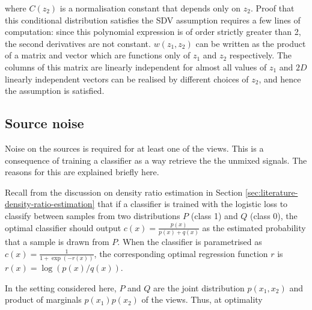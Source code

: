 where $C(z_2)$ is a normalisation constant that depends only on $z_2$.
Proof that this conditional distribution satisfies the SDV assumption requires a few lines of computation:
since this polynomial expression is of order strictly greater than 2, the second derivatives are not constant.
${w}(z_1, z_2)$ can be written as the product of a matrix and vector which are functions only of $z_1$ and $z_2$ respectively.
The columns of this matrix are linearly independent for almost all values of $z_1$ and $2D$ linearly independent vectors can be realised by different choices of $z_2$, and hence the assumption is satisfied.


\subsection{Source noise}\label{sec:converged}

Noise on the sources is required for at least one of the views. 
This is a consequence of training a classifier as a way retrieve the the unmixed signals.
The reasons for this are explained briefly here.

Recall from the discussion on density ratio estimation in Section \ref{sec:literature-density-ratio-estimation} that if a classifier is trained with the logistic loss to classify between samples from two distributions $P$ (class 1) and $Q$ (class 0), the optimal classifier should output $c(x) = \frac{p(x)}{p(x) + q(x)}$ as the estimated probability that a sample is drawn from $P$.
When the classifier is parametrised as $c(x) = \frac{1}{1 + \exp(-r(x))}$, the corresponding optimal regression function $r$ is $r(x) = \log( p(x) / q(x))$. 

In the setting considered here, $P$ and $Q$ are the joint distribution $p(x_1, x_2)$ and product of marginals $p(x_1)p(x_2)$ of the views.
Thus, at optimality



